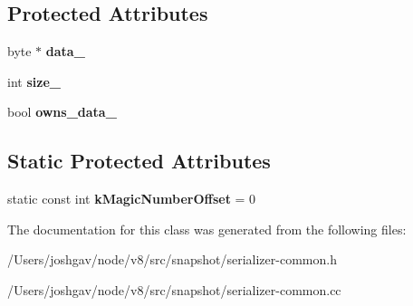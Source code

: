 \subsection*{Protected Attributes}
\begin{DoxyCompactItemize}
\item 
byte $\ast$ {\bfseries data\+\_\+}\hypertarget{classv8_1_1internal_1_1_serialized_data_a64749942df326ecb95dde8af526157ee}{}\label{classv8_1_1internal_1_1_serialized_data_a64749942df326ecb95dde8af526157ee}

\item 
int {\bfseries size\+\_\+}\hypertarget{classv8_1_1internal_1_1_serialized_data_ae71136bca7d33ec77726470ee8543485}{}\label{classv8_1_1internal_1_1_serialized_data_ae71136bca7d33ec77726470ee8543485}

\item 
bool {\bfseries owns\+\_\+data\+\_\+}\hypertarget{classv8_1_1internal_1_1_serialized_data_a755ae910320bb00afc3721c8e270560f}{}\label{classv8_1_1internal_1_1_serialized_data_a755ae910320bb00afc3721c8e270560f}

\end{DoxyCompactItemize}
\subsection*{Static Protected Attributes}
\begin{DoxyCompactItemize}
\item 
static const int {\bfseries k\+Magic\+Number\+Offset} = 0\hypertarget{classv8_1_1internal_1_1_serialized_data_af2bb5ac5d5543b2d537b43c74b3dec8f}{}\label{classv8_1_1internal_1_1_serialized_data_af2bb5ac5d5543b2d537b43c74b3dec8f}

\end{DoxyCompactItemize}


The documentation for this class was generated from the following files\+:\begin{DoxyCompactItemize}
\item 
/\+Users/joshgav/node/v8/src/snapshot/serializer-\/common.\+h\item 
/\+Users/joshgav/node/v8/src/snapshot/serializer-\/common.\+cc\end{DoxyCompactItemize}
